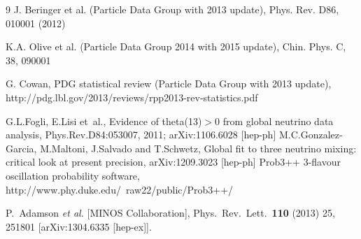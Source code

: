 \begin{thebibliography}{9}
J. Beringer et al. (Particle Data Group with 2013 update), 
Phys. Rev. D86, 010001 (2012)

K.A. Olive et al. (Particle Data Group 2014 with 2015 update), 
Chin. Phys. C, 38, 090001

G. Cowan, PDG statistical review (Particle Data Group with 2013 update),
http://pdg.lbl.gov/2013/reviews/rpp2013-rev-statistics.pdf

% 
%
%
%
  G.L.Fogli, E.Lisi et~al.,
  Evidence of theta(13)$>$0 from global neutrino data analysis,
  Phys.Rev.D84:053007, 2011; arXiv:1106.6028 [hep-ph]
 M.C.Gonzalez-Garcia, M.Maltoni, J.Salvado and T.Schwetz,
 Global fit to three neutrino mixing: critical look at present precision,
 arXiv:1209.3023 [hep-ph]
%
%
%
%
 Prob3++ 3-flavour oscillation probability software,
 http://www.phy.duke.edu/~raw22/public/Prob3++/
 
  P.~Adamson {\it et al.}  [MINOS Collaboration],
  Phys.\ Rev.\ Lett.\  {\bf 110} (2013) 25,  251801
  [arXiv:1304.6335 [hep-ex]].

\end{thebibliography}


